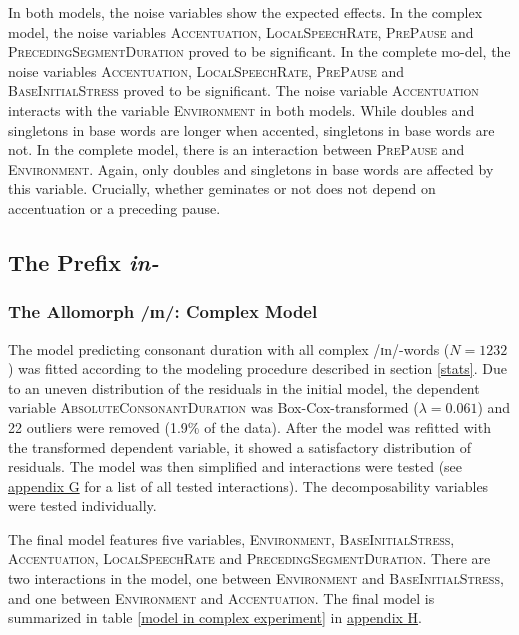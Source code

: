  In both models, the noise variables show the expected effects. In the complex model, the noise variables \textsc{Accentuation}, \textsc{LocalSpeechRate}, \textsc{PrePause} and \textsc{PrecedingSegmentDuration} proved to be significant. In the complete mo-del, the noise variables \textsc{Accentuation}, \textsc{LocalSpeechRate}, \textsc{PrePause} and \textsc{BaseInitialStress} proved to be significant.
 The noise variable \textsc{Accentuation} interacts with the variable \textsc{Environment} in both models. While doubles and singletons in base words are longer when accented, singletons in base words are not. In the complete model, there is an interaction between \textsc{PrePause} and \textsc{Environment}. Again, only doubles and singletons in base words are affected by this variable. Crucially,  whether  geminates or not does not depend on accentuation or a preceding pause. 


\subsection{The Prefix \textit{in-}} \label{in experiment}

\subsubsection{The Allomorph /ɪn/: Complex Model}

The model predicting consonant duration with all complex /ɪn/-words ($N=1232$) was fitted according to the modeling procedure described in section \ref{stats}. Due to an uneven distribution of the residuals in the initial model, the dependent variable \textsc{AbsoluteConsonantDuration} was Box-Cox-transformed ($\lambda = 0.061$) and 22 outliers were removed (1.9\% of the data).
After the model was refitted with the transformed dependent variable, it showed a satisfactory distribution of residuals.  The model was then simplified and interactions were tested (see \hyperref[Appendix G Summaries of tested interactions in experimental study]{appendix G} for a list of all tested interactions).
The decomposability variables were tested individually.

The final model features five variables, \textsc{Environment}, \textsc{BaseInitialStress}, \textsc{Accentuation}, \textsc{LocalSpeechRate} and \textsc{PrecedingSegmentDuration}. 
There are two interactions in the model, one between \textsc{Environment} and \textsc{BaseInitialStress}, and one between \textsc{Environment} and \textsc{Accentuation}. The final model is summarized in table \ref{model in complex experiment} in \hyperref[Appendix H: Model Summaries Experiment]{appendix H}.


